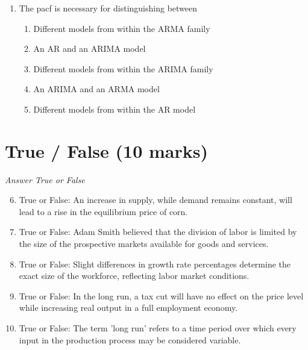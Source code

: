 \documentclass[12pt]{article}
\begin{document}
\begin{enumerate}[label=\arabic*.]
\begin{enumerate}[label=(\alph*)]
    \item calls for the federal government to run a deficit.
    \item calls for the federal government to run a surplus.
    \item is increased taxes and government spending.
    \item is decreased government spending and taxes.
\end{enumerate}
\item The pacf is necessary for distinguishing between
\begin{enumerate}[label=(\alph*)]
    \item Different models from within the ARMA family
    \item An AR and an ARIMA model
    \item Different models from within the ARIMA family
    \item An ARIMA and an ARMA model
    \item Different models from within the AR model
\end{enumerate}
\end{enumerate}

\section*{True / False (10 marks)}
\textit{Answer True or False}
\begin{enumerate}[label=\arabic*.]
\setcounter{enumi}{5}
\item True or False: An increase in supply, while demand remains constant, will lead to a rise in the equilibrium price of corn.
\item True or False: Adam Smith believed that the division of labor is limited by the size of the prospective markets available for goods and services.
\item True or False: Slight differences in growth rate percentages determine the exact size of the workforce, reflecting labor market conditions.
\item True or False: In the long run, a tax cut will have no effect on the price level while increasing real output in a full employment economy.
\item True or False: The term 'long run' refers to a time period over which every input in the production process may be considered variable.
\end{enumerate}
\end{document}
